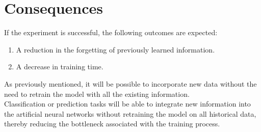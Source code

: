 \section{Consequences}

If the experiment is successful, the following outcomes are expected:
\begin{enumerate}
    \item A reduction in the forgetting of previously learned information.
    \item A decrease in training time.
\end{enumerate}

As previously mentioned, it will be possible to incorporate new data without the need to retrain the model with all the existing information. \\

Classification or prediction tasks will be able to integrate new information into the artificial neural networks without retraining the model on all historical data, thereby reducing the bottleneck associated with the training process.
